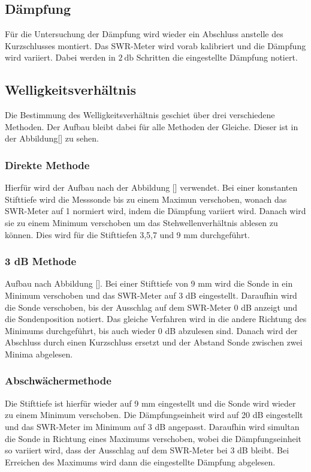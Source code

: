 \subsection{Dämpfung}
Für die Untersuchung der Dämpfung wird wieder ein Abschluss anstelle des Kurzschlusses montiert. Das SWR-Meter wird vorab kalibriert und die Dämpfung wird variiert. Dabei werden 
in $\SI{2}{\decibel} $ Schritten die eingestellte Dämpfung notiert. 

\subsection{Welligkeitsverhältnis}

Die Bestimmung des Welligkeitsverhältnis geschiet über drei verschiedene Methoden. Der Aufbau bleibt dabei für alle Methoden der Gleiche. Dieser ist in der Abbildung[] zu sehen.

\subsubsection{Direkte Methode}
Hierfür wird der Aufbau nach der Abbildung [] verwendet. 
Bei einer konstanten Stifttiefe wird die Messsonde bis zu einem Maximun verschoben, wonach das SWR-Meter auf 1 normiert wird, indem die Dämpfung variiert wird. Danach wird sie zu
einem Minimum verschoben um das Stehwellenverhältnis ablesen zu können. Dies wird für die Stifttiefen 3,5,7 und 9 $\si{\mm}$ durchgeführt.

\subsubsection{3 dB Methode}
Aufbau nach Abbildung []. Bei einer Stifttiefe von 9 mm wird die Sonde in ein Minimum verschoben und das SWR-Meter auf 3 dB eingestellt. Daraufhin wird die Sonde verschoben, bis 
der Ausschlag auf dem SWR-Meter 0 dB anzeigt und die Sondenposition notiert. Das gleiche Verfahren wird in die andere Richtung des Minimums durchgeführt, bis auch wieder 0 dB 
abzulesen sind. Danach wird der Abschluss durch einen Kurzschluss ersetzt und der Abstand Sonde zwischen zwei Minima abgelesen.


\subsubsection{Abschwächermethode}
Die Stifttiefe ist hierfür wieder auf 9 mm eingestellt und die Sonde wird wieder zu einem Minimum verschoben. Die Dämpfungseinheit wird auf 20 dB eingestellt und das SWR-Meter im 
Minimum auf 3 dB angepasst. Daraufhin wird simultan die Sonde in Richtung eines Maximums verschoben, wobei die Dämpfungseinheit so variiert wird, dass der Ausschlag auf dem SWR-Meter 
bei 3 dB bleibt. Bei Erreichen des Maximums wird dann die eingestellte Dämpfung abgelesen. 
